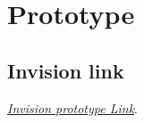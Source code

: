 \documentclass[../main.tex]{subfiles}
\begin{document}
 
    \chapter{Prototype}\label{ch:prototype}


    \section{Invision link}\label{sec:invision_link}
    \href{https://invis.io/P3X4WSWR7JS#/417983015_Homepage}{\textit{Invision prototype Link}}.
\end{document}
